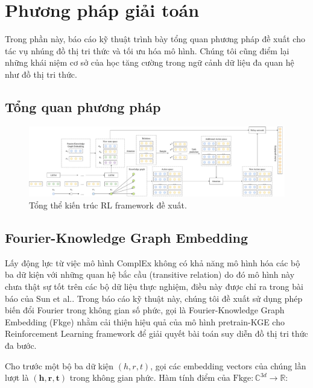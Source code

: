 \section{Phương pháp giải toán}

Trong phần này, báo cáo kỹ thuật trình bày tổng quan phương pháp đề xuất cho tác vụ nhúng đồ thị tri thức và tối ưu hóa mô hình. Chúng tôi cũng điểm lại những khái niệm cơ sở của học tăng cường trong ngữ cảnh dữ liệu đa quan hệ như đồ thị tri thức.

\subsection{Tổng quan phương pháp}

\begin{figure}
    \includegraphics[width=1.\linewidth]{rl_framework.pdf}
    \caption{Tổng thể kiến trúc RL framework đề xuất.}
    \label{fig:rl_frame_arch}
\end{figure}


\subsection{Fourier-Knowledge Graph Embedding}

Lấy động lực từ việc mô hình ComplEx không có khả năng mô hình hóa các bộ ba dữ kiện với những quan hệ bắc cầu (transitive relation)
do đó mô hình này chưa thật sự tốt trên các bộ dữ liệu thực nghiệm, điều này được chỉ ra trong bài báo của Sun et al.\cite{sun2019rotate}.
Trong báo cáo kỹ thuật này, chúng tôi đề xuất sử dụng phép biến đổi Fourier trong không gian số phức, gọi là Fourier-Knowledge Graph Embedding (Fkge)
nhằm cải thiện hiệu quả của mô hình pretrain-KGE cho Reinforcement Learning framework để giải quyết bài toán suy diễn đồ thị tri thức đa bước.

Cho trước một bộ ba dữ kiện $(h, r, t)$, gọi các embedding vectors của chúng lần lượt là $(\mathbf{h}, \mathbf{r}, \mathbf{t})$ trong không gian phức. 
Hàm tính điểm của $\text{Fkge}: \mathbb{C}^{3d} \rightarrow \mathbb{R}$:

